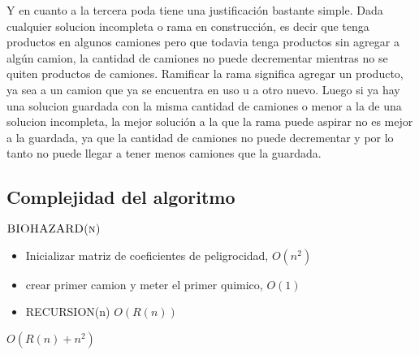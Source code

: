 Y en cuanto a la tercera poda tiene una justificaci\'on bastante simple. Dada cualquier solucion incompleta o rama en construcci\'on, es decir que tenga productos en algunos camiones pero que todavia tenga productos sin agregar a alg\'un camion, la cantidad de camiones no puede decrementar mientras no se quiten productos de camiones. Ramificar la rama significa agregar un producto, ya sea a un camion que ya se encuentra en uso u a otro nuevo. Luego si ya hay una solucion guardada con la misma cantidad de camiones o menor a la de una solucion incompleta, la mejor soluci\'on a la que la rama puede aspirar no es mejor a la guardada, ya que la cantidad de camiones no puede decrementar y por lo tanto no puede llegar a tener menos camiones que la guardada.


\subsection{Complejidad del algoritmo}




$\textnormal{\scshape BIOHAZARD(n)}$
\begin{itemize}
	\item Inicializar matriz de coeficientes de peligrocidad,		$O(n^2)$
	\item crear primer camion y meter el primer quimico,		$O(1)$
	\item RECURSION(n)										$O(R(n))$
\end{itemize}		$O(R(n) + n^2 )$ 



